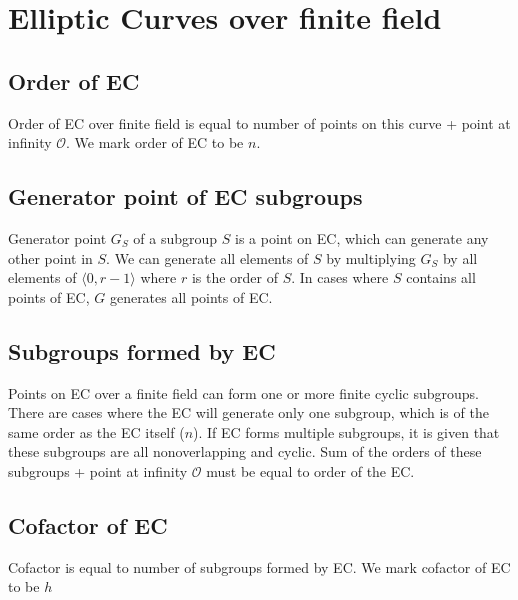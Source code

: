 \documentclass[bp,en]{FEIstyle}
\begin{document}
\newpage

\section*{Elliptic Curves over finite field}

\subsection*{Order of EC}
Order of EC over finite field is equal to number of points on this curve + point at infinity $\mathcal{O}$. We mark order of EC to be $n$.

\subsection*{Generator point of EC subgroups}
Generator point $G_S$ of a subgroup $S$ is a point on EC, which can generate any other point in $S$. We can generate all elements of $S$ by multiplying $G_S$ by all elements of $\langle 0,r-1\rangle $ where $r$ is the order of $S$. In cases where $S$ contains all points of EC, $G$ generates all points of EC.

\subsection*{Subgroups formed by EC}
Points on EC over a finite field can form one or more finite cyclic subgroups. There are cases where the EC will generate only one subgroup, which is of the same order as the EC itself ($n$). If EC forms multiple subgroups, it is given that these subgroups are all nonoverlapping and cyclic. Sum of the orders of these subgroups + point at infinity $\mathcal{O}$ must be equal to order of the EC. 

\subsection*{Cofactor of EC}
Cofactor is equal to number of subgroups formed by EC. We mark cofactor of EC to be $h$


\end{document}
